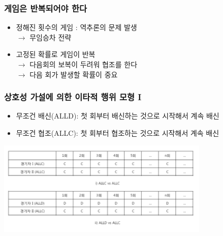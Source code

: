 \documentclass[final]{beamer}
\begin{document}
\begin{frame}\frametitle{게임은 반복되어야 한다}\vspace{5mm}
\begin{itemize}\large
\item 정해진 횟수의 게임 : 역추론의 문제 발생\\
$\rightarrow$ 무임승차 전략
\item 고정된 확률로 게임이 반복 \\
$\rightarrow$ 다음회의 보복이 두려워 협조를 한다 \\
$\rightarrow$ 다음 회가 발생할 확률이 중요
\end{itemize}
\end{frame}

\begin{frame}\frametitle{상호성 가설에 의한 이타적 행위 모형 I}\vspace{5mm}
\begin{itemize}\large
\item 무조건 배신(ALLD): 첫 회부터 배신하는 것으로 시작해서 계속 배신 \\
\item 무조건 협조(ALLC): 첫 회부터 협조하는 것으로 시작해서 계속 배신
\end{itemize}
\begin{center}
\includegraphics[width=4in]{alldallc01.png}
\end{center}
\end{frame}
\end{document}
